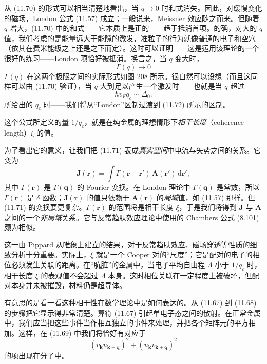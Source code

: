 从 (11.70) 的形式可以相当清楚地看出，当 $q\to 0$ 时和式消失。因此，对缓慢变化的磁场，London 公式 (11.57) 成立；一般说来，Meissner 效应随之而来。但随着 $q$ 增大，(11.70) 中的和式——它本质上是正的——趋于抵消首项。的确，对大的 $q$ 值，我们考虑的是能量远大于能隙的激发，准粒子的行为就像普通的电子和空穴（依其在费米能级之上还是之下而定）。这时可以证明——这是运用该理论的一个很好的练习——London 项恰好被抵消。换言之，当 $q$ 变大时，
\begin{equation*}
\Gamma(q) \to 0 \tag{11.72}
\end{equation*}
$\Gamma(q)$ 在这两个极限之间的实际形式如图 208 所示。很自然可以设想（而且这同样可以由 (11.70) 验证），当 $q$ 大到足以产生一个激发时——也就是当 $q$ 超过
\begin{equation*}
\hbar v_F q_c \sim \Delta_0. \tag{11.73}
\end{equation*}
所给出的 $q_c$ 时——我们将从“London”区制过渡到 (11.72) 所示的区制。


这个公式所定义的量 $1/q_c$，就是在纯金属的理想情形下\emph{相干长度}（coherence length）$\xi$ 的值。

为了看出它的意义，让我们把 (11.71) 表成\emph{真实空间}中电流与矢势之间的关系。它变为
\begin{equation*}
\mathbf{J}(\mathbf{r}) = \int \Gamma(\mathbf{r}-\mathbf{r}')\,\mathbf{A}(\mathbf{r}')\,\mathrm{d}\mathbf{r}', \tag{11.74}
\end{equation*}
其中 $\Gamma(\mathbf{r})$ 是 $\Gamma(\mathbf{q})$ 的 Fourier 变换。在 London 理论中 $\Gamma(\mathbf{q})$ 是常数，所以 $\Gamma(\mathbf{r})$ 是 $\delta$ 函数；$\mathbf{J}(\mathbf{r})$ 的值只依赖于 $\mathbf{A}(\mathbf{r})$ 的\emph{局域}值，如 (11.57) 那样。但 (11.71) 的变换要更复杂。$\Gamma(\mathbf{r})$ 的范围将是相干长度 $\xi$，于是我们将得到 $\mathbf{J}$ 与 $\mathbf{A}$ 之间的一个\emph{非局域}关系。它与反常趋肤效应理论中使用的 Chambers 公式 (8.101) 颇为相似。

这一由 Pippard 从唯象上建立的结果，对于反常趋肤效应、磁场穿透等性质的细致分析十分重要。实际上，$\xi$ 就是一个 Cooper 对的“尺度”；它是配对的电子的相位必须发生关联的距离。在“肮脏”的金属中，当电子平均自由程 $\Lambda$ 小于 $1/q_c$ 时，相干长度 $\xi$ 的表观值不会超过 $\Lambda$ 本身。这时相位关联在一定程度上被破坏，但配对本身并未被摧毁，材料仍是超导体。

有意思的是看一看这种相干性在数学理论中是如何表达的。从 (11.67) 到 (11.68) 的步骤把它显示得非常清楚。算符 (11.67) 引起单电子态之间的散射。在正常金属中，我们应当把这些事件当作相互独立的事件来处理，并把各个矩阵元的平方相加。这样，在 (11.69) 中我们将恰好有对应于
\begin{equation*}
(v_{\mathbf{k}}u_{\mathbf{k}+\mathbf{q}})^{2} + (u_{\mathbf{k}}v_{\mathbf{k}+\mathbf{q}})^{2} \tag{11.75}
\end{equation*}
的项出现在分子中。

